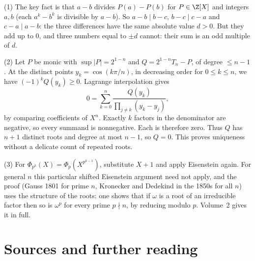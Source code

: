 (1) The key fact is that $a-b$ divides $P(a)-P(b)$ for $P\in\Z[X]$ and integers $a,b$ (each $a^k-b^k$ is divisible by $a-b$). So $a-b\mid b-c$, $b-c\mid c-a$ and $c-a\mid a-b$: the three differences have the same absolute value $d>0$. But they add up to $0$, and three numbers equal to $\pm d$ cannot: their sum is an odd multiple of $d$.

(2) Let $P$ be monic with $\sup|P|=2^{1-n}$ and $Q=2^{1-n}T_n-P$, of degree $\le n-1$. At the distinct points $y_k=\cos(k\pi/n)$, in decreasing order for $0\le k\le n$, we have $(-1)^kQ(y_k)\ge0$. Lagrange interpolation gives
\[
0=\sum_{k=0}^n\frac{Q(y_k)}{\prod_{j\ne k}(y_k-y_j)},
\]
by comparing coefficients of $X^n$. Exactly $k$ factors in the denominator are negative, so every summand is nonnegative. Each is therefore zero. Thus $Q$ has $n+1$ distinct roots and degree at most $n-1$, so $Q=0$. This proves uniqueness without a delicate count of repeated roots.

(3) For $\Phi_{p^k}(X)=\Phi_p(X^{p^{k-1}})$, substitute $X+1$ and apply Eisenstein again. For general $n$ this particular shifted Eisenstein argument need not apply, and the proof (Gauss 1801 for prime $n$, Kronecker and Dedekind in the 1850s for all $n$) uses the structure of the roots: one shows that if $\omega$ is a root of an irreducible factor then so is $\omega^p$ for every prime $p\nmid n$, by reducing modulo $p$. Volume~2 gives it in full.

\section*{Sources and further reading}


